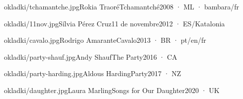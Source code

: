 \documentclass[10pt,twoside]{article}
\begin{document}
\lipsum[39]

\begin{album}{okladki/tchamantche.jpg}{Rokia Traoré}{Tchamantché}{2008 · ML · bambara/fr}
\lipsum[40][1-3]
\end{album}

\begin{album}{okladki/11nov.jpg}{Sílvia Pérez Cruz}{11 de novembre}{2012 · ES/Katalonia}
\lipsum[41][1-3]
\end{album}

\begin{album}{okladki/cavalo.jpg}{Rodrigo Amarante}{Cavalo}{2013 · BR · pt/en/fr}
\lipsum[42][1-3]
\end{album}

\begin{album}{okladki/party-shauf.jpg}{Andy Shauf}{The Party}{2016 · CA}
\lipsum[43][1-3]
\end{album}

\begin{album}{okladki/party-harding.jpg}{Aldous Harding}{Party}{2017 · NZ}
\lipsum[44][1-3]
\end{album}

\begin{album}{okladki/daughter.jpg}{Laura Marling}{Songs for Our Daughter}{2020 · UK}
\lipsum[45][1-3]
\end{album}
\end{document}
